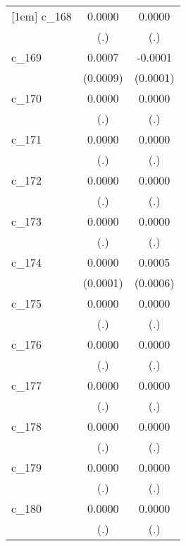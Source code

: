 {\begin{tabular}{l*{2}{c}}
[1em]
c\_168       &      0.0000        &      0.0000        \\
            &         (.)        &         (.)        \\
[1em]
c\_169       &      0.0007        &     -0.0001        \\
            &    (0.0009)        &    (0.0001)        \\
[1em]
c\_170       &      0.0000        &      0.0000        \\
            &         (.)        &         (.)        \\
[1em]
c\_171       &      0.0000        &      0.0000        \\
            &         (.)        &         (.)        \\
[1em]
c\_172       &      0.0000        &      0.0000        \\
            &         (.)        &         (.)        \\
[1em]
c\_173       &      0.0000        &      0.0000        \\
            &         (.)        &         (.)        \\
[1em]
c\_174       &      0.0000        &      0.0005        \\
            &    (0.0001)        &    (0.0006)        \\
[1em]
c\_175       &      0.0000        &      0.0000        \\
            &         (.)        &         (.)        \\
[1em]
c\_176       &      0.0000        &      0.0000        \\
            &         (.)        &         (.)        \\
[1em]
c\_177       &      0.0000        &      0.0000        \\
            &         (.)        &         (.)        \\
[1em]
c\_178       &      0.0000        &      0.0000        \\
            &         (.)        &         (.)        \\
[1em]
c\_179       &      0.0000        &      0.0000        \\
            &         (.)        &         (.)        \\
[1em]
c\_180       &      0.0000        &      0.0000        \\
            &         (.)        &         (.)        \\

\end{tabular}}
